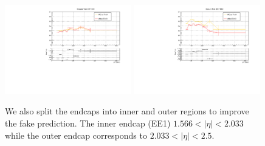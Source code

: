\begin{figure}[!htbp]
  \caption{We also split the endcaps into inner and outer regions to improve the fake prediction. The inner endcap (EE1) $1.566 < |\eta| < 2.033$ while the outer endcap corresponds to $2.033 < \lvert \eta \rvert< 2.5$.}
  \centering
  \includegraphics[width=0.49\textwidth]{fig/closureTest_MCTruth_comparisonsEE1_2017_adjustrange.pdf}
  \includegraphics[width=0.49\textwidth]{fig/closureTest_MCTruth_comparisonsEE2_2017_adjustrange.pdf}
  \label{fig:templates_2017_etaBinnedEE}
\end{figure}



